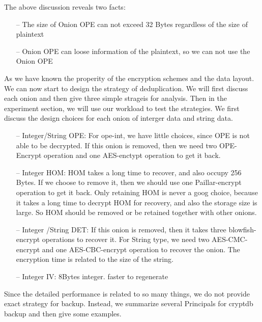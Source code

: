 The above discussion reveals two facts:

\begin{itemize}
\item[--] The size of Onion OPE can not exceed 32 Bytes regardless of the size of plaintext
\item[--] Onion OPE can loose information of the plaintext, so we can not use the Onion OPE
\end{itemize}



As we have known the properity of the encryption schemes and the data layout. We can now start to design the strategy of deduplication. We will first discuss each onion and then give three simple strageis for analysis. Then in the experiment section, we will use our workload to test the strategies. We first discuss the design choices for each onion of interger data and string data. 


\begin{itemize}
\item[--] Integer/String OPE: For ope-int, we have little choices, since OPE is not able to be decrypted. If this onion is removed, then we need two OPE-Encrypt operation and one AES-enctypt operation to get it back. 
\item[--] Integer HOM: HOM takes a long time to recover, and also occupy 256 Bytes. If we choose to remove it, then we should use one Paillar-encrypt operation to get it back. Only retaining HOM is never a goog choice, because it takes a long time to decrypt HOM for recovery, and also the storage size is large. So HOM should be removed or be retained together with other onions.
\item[--] Integer /String DET: If this onion is removed, then it takes three blowfish-encrypt operations to recover it. For String type, we need two AES-CMC-encrypt and one AES-CBC-encrypt operation to recover the onion. The encryption time is related to the size of the string.
\item[--] Integer IV: 8Bytes integer. faster to regenerate
\end{itemize}



Since the detailed performance is related to so many things, we do not provide exact strategy for backup. Instead, we summarize several Principals for cryptdb backup and then give some examples. 

